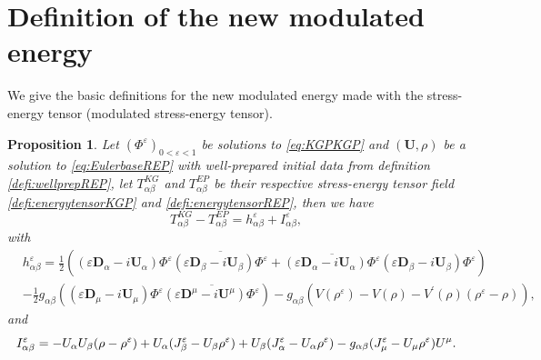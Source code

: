\documentclass[a4paper, 15pt]{article}
\numberwithin{equation}{section}
\newtheorem{propal}[defi]{Proposition}
\begin{document}
\section{Definition of the new modulated energy}
\label{section:defmod}
We give the basic definitions for the new modulated energy made with the stress-energy tensor (modulated stress-energy tensor).\\
\begin{propal}
\label{propal:tensordiffdefmod}Let $(\Phi^\varepsilon)_{0<\varepsilon<1}$ be solutions to \eqref{eq:KGPKGP} and $(\textbf{U},\rho)$ be a solution to \eqref{eq:EulerbaseREP} with well-prepared initial data from definition \ref{defi:wellprepREP}, let $T_{\alpha\beta}^{KG}$ and $T_{\alpha\beta}^{EP}$ be their respective stress-energy tensor field \ref{defi:energytensorKGP} and \ref{defi:energytensorREP}, then we have
    \begin{equation}
        T_{\alpha\beta}^{KG}-T_{\alpha\beta}^{EP}=h^\varepsilon_{\alpha\beta}+I^\varepsilon_{\alpha\beta},
    \end{equation}
with 
\begin{align*}
\label{hdefdefmod}
&h_{\alpha\beta}^\varepsilon=\frac{1}{2}((\varepsilon\textbf{D}_\alpha-i\textbf{U}_\alpha)\Phi^\varepsilon\overline{(\varepsilon\textbf{D}_\beta-i\textbf{U}_\beta)\Phi^\varepsilon}+\overline{(\varepsilon\textbf{D}_\alpha-i\textbf{U}_\alpha)\Phi^\varepsilon}(\varepsilon\textbf{D}_\beta-i\textbf{U}_\beta)\Phi^\varepsilon)\\
&-\frac{1}{2}g_{\alpha\beta}((\varepsilon\textbf{D}_\mu-i\textbf{U}_\mu)\Phi^\varepsilon\overline{(\varepsilon\textbf{D}^\mu-i\textbf{U}^\mu )\Phi^\varepsilon})-g_{\alpha\beta}(V(\rho^\varepsilon)-V(\rho)-V^{\prime}(\rho)(\rho^\varepsilon-\rho)),
\end{align*}
and 
\begin{equation}
\label{Idefdefmod}
I^\varepsilon_{\alpha\beta}=-\textbf{U}_\alpha \textbf{U}_\beta (\rho-\rho^\varepsilon)+\textbf{U}_\alpha (\textbf{J}^\varepsilon_\beta-\textbf{U}_\beta\rho^\varepsilon)+\textbf{U}_\beta (\textbf{J}^\varepsilon_\alpha-\textbf{U}_\alpha\rho^\varepsilon)-g_{\alpha\beta}(\textbf{J}^\varepsilon_\mu-\textbf{U}_\mu \rho^\varepsilon)\textbf{U}^\mu.\\
\end{equation}
\end{propal}
\end{document}
